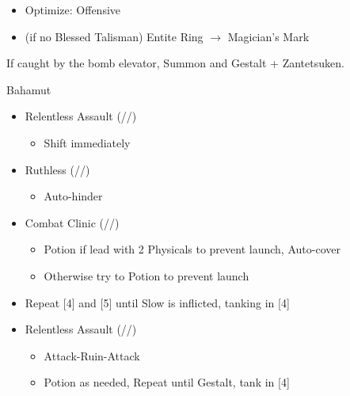 \begin{multicols}{2}
\begin{menu}
\begin{itemize}
\begin{itemize}
				      \begin{itemize}
					      \item Optimize: Offensive
					      \item (if no Blessed Talisman) Entite Ring $\rightarrow$ Magician's Mark
				      \end{itemize}
			\end{itemize}
		\end{itemize}
	\end{menu}
	If caught by the bomb elevator, Summon and Gestalt + Zantetsuken.
	\renewcommand{\first}{[1] Relentless Assault (\com/\rav/\rav)}
	\renewcommand{\fifth}{[5] Ruthless (\sab/\com/\rav)
		\renewcommand{\fourth}{[4] Combat Clinic (\sen/\med/\med)}}
	\begin{battle}[0:42]{Bahamut}
		\begin{itemize}
			\item \first
			      \begin{itemize}
				      \item Shift immediately
			      \end{itemize}
			\item \fifth
			      \begin{itemize}
				      \item Auto-hinder
			      \end{itemize}
			\item \fourth
			      \begin{itemize}
				      \item Potion if lead with 2 Physicals to prevent launch, Auto-cover
				      \item Otherwise try to Potion to prevent launch
			      \end{itemize}
			\item Repeat [4] and [5] until Slow is inflicted, tanking in [4]
			\item \first
			      \begin{itemize}
				      \item Attack-Ruin-Attack
				      \item Potion as needed, Repeat until Gestalt, tank in [4]
			      \end{itemize}
		\end{itemize}
	\end{battle}
\end{multicols}
